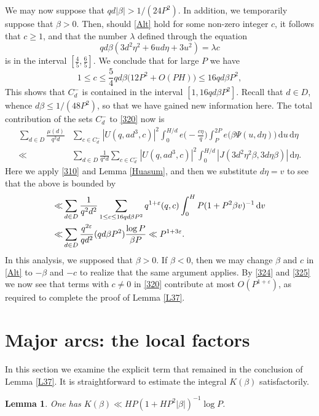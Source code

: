 \documentclass[reqno]{amsart}
\newcommand{\f}[2]{\frac{#1}{#2}}
\newcommand\dd{{\mathrm d}}
\newcommand\ts{\textstyle}
\newtheorem{lemma}[thm]{Lemma}
\numberwithin{equation}{section}
\begin{document}
We may now suppose that $qd|\beta| > 1/(24P^2)$. In addition, we temporarily suppose that $\beta>0$. Then, should \eqref{Alt} hold for some non-zero integer $c$, it follows that $c\ge 1$, and that the number $\lambda$ defined through the equation
$$  qd\beta (3d^2\eta^2 + 6ud\eta + 3u^2) =\lambda c$$
is in the interval $[\f45,\f65]$. We conclude that for large $P$ we have
$$ 1\le c \le \ts \f54 qd\beta \big( 12P^2 +O(PH)\big) \le 16 qd\beta P^2,$$This shows that $C_d^-$ is contained in the interval $[1,16qd\beta P^2]$. Recall that $d\in D$, whence $d\beta \le 1/(48P^2)$, so that we have gained new information here. The total contribution of the sets $C_d^-$ to \eqref{320} now is
\begin{align*} 
 \sum_{d\in D} \frac{\mu(d)}{q^2d}&
\sum_{c\in C_d^-}|U(q,ad^3, c)|^2\int_0^{H/d} e\Big( - \frac{c\eta}{q}\Big)   \int_P^{2P}
e\big(\beta\Psi(u,d\eta)\big)\,\dd u\,\dd \eta \\
\ll & \sum_{d\in D} \frac{1}{q^2d}
\sum_{c\in C_d^-}|U(q,ad^3, c)|^2 \int_0^{H/d} |J(3d^2\eta^2\beta, 3d\eta\beta)|\,\dd\eta.
\end{align*}
Here we apply \eqref{310} and Lemma \ref{Huasum}, and then we substitute $d\eta = v$ to see that the above is bounded by
\begin{align}
\ll & \sum_{d\in D} \frac{1}{q^2d^2} \sum_{1\le c\le 16qd\beta P^2} q^{1+\varepsilon}(q,c) \int_0^H P(1+P^2\beta v)^{-1}\,\dd v \notag\\
\ll & \sum_{d\in D} \frac{q^{2\varepsilon}}{qd^2} (qd\beta P^2) \frac{\log P}{\beta P} \ll P^{1+3\varepsilon}. \label{325}
\end{align}
In this analysis, we supposed that $\beta >0$. If $\beta < 0$, then we may change $\beta$ and $c$ in \eqref{Alt} to $-\beta$ and $-c$ to realize that the same argument applies. By \eqref{324} and \eqref{325} we now see that terms with $c\neq 0$ in \eqref{320} contribute at most $O(P^{1+\varepsilon})$, as required to complete the proof of Lemma \ref{L37}.

\section{Major arcs: the local factors}

In this section we examine the explicit term that remained in the conclusion of Lemma \ref{L37}. It is straightforward to estimate the integral $K(\beta)$ satisfactorily.

\begin{lemma}\label{L38} One has $K(\beta) \ll HP(1+HP^2|\beta|)^{-1} \log P$.
\end{lemma}
\end{document}
